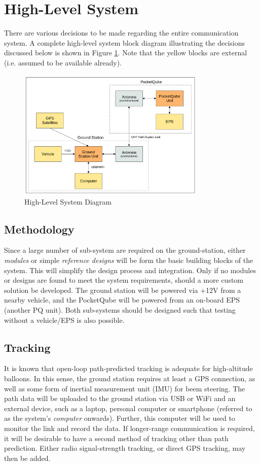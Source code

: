 \graphicspath{{./figures}}

\section{High-Level System}
There are various decisions to be made regarding the entire communication system. A complete high-level system block diagram illustrating the decisions discussed below is shown in Figure \ref{fig:complete_system}. Note that the yellow blocks are external (i.e. assumed to be available already).

\begin{figure}[!htb]
    \centering
    \includegraphics[width=0.8\textwidth]{complete_system.png}
    \caption{High-Level System Diagram}
    \label{fig:complete_system}
  \end{figure}

\newpage
\subsection{Methodology}
Since a large number of sub-system are required on the ground-station, either \textit{modules} or simple \textit{reference designs} will be form the basic building blocks of the system. This will simplify the design process and integration. Only if no modules or designs are found to meet the system requirements, should a more custom solution be developed. The ground station will be powered via +12V from a nearby vehicle, and the PocketQube will be powered from an on-board EPS (another PQ unit). Both sub-systems should be designed such that testing without a vehicle/EPS is also possible.

\subsection{Tracking}
It is known that open-loop path-predicted tracking is adequate for high-altitude balloons. In this sense, the ground station requires at least a GPS connection, as well as some form of inertial measurement unit (IMU) for beem steering. The path data will be uploaded to the ground station via USB or WiFi and an external device, such as a laptop, personal computer or smartphone (referred to as the system's \textit{computer} onwards). Further, this computer will be used to monitor the link and record the data. If longer-range communication is required, it will be desirable to have a second method of tracking other than path prediction. Either radio signal-strength tracking, or direct GPS tracking, may then be added.


